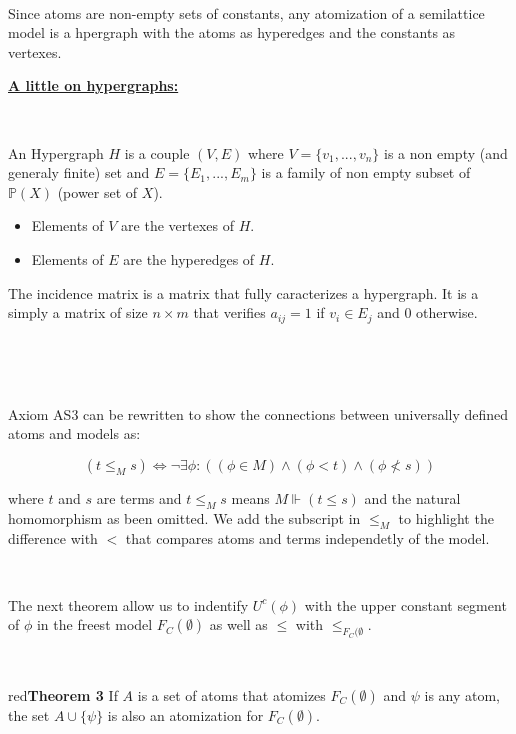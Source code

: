 \documentclass[a4paper, 11pt]{article}
\begin{document}
\

Since atoms are non-empty sets of constants, any atomization of a semilattice model is a hpergraph with the atoms as hyperedges and the constants as vertexes.

\newpage

\noindent
\underline{\textbf{A little on hypergraphs:}}

\

An Hypergraph $H$ is a couple $(V, E)$ where $V =\{v_1, ..., v_n\}$ is a non empty (and generaly finite) set and $E =\{E_1, ..., E_m\}$ is a family of non empty subset of $\mathbb{P}(X)$ (power set of $X$).
\begin{itemize} 
	\item Elements of $V$ are the vertexes of $H$.
	\item Elements of $E$ are the hyperedges of $H$.
\end{itemize}

The incidence matrix is a matrix that fully caracterizes a hypergraph. It is a simply a matrix of size $n \times m$ that verifies $a_{ij} = 1$ if $v_i \in E_j$ and 0 otherwise.

\

\

Axiom AS3 can be rewritten to show the connections between universally defined atoms and models as:

$$(t \leq_M s) \Leftrightarrow \neg \exists \phi : ((\phi \in M) \land (\phi < t) \land (\phi \not < s))$$

where $t$ and $s$ are terms and $t \leq_M s$ means $M \Vdash (t \leq s)$ and the natural homomorphism as been omitted. We add the subscript in $\leq_M$ to highlight the difference with $<$ that compares atoms and terms independetly of the model. 

\

The next theorem allow us to indentify $U^c(\phi)$ with the upper constant segment of $\phi$ in the freest model $F_C(\emptyset)$ as well as $\leq$ with $\leq_{F_C(\emptyset}$.

\

\begin{mybox}{red}{\textbf{Theorem 3}}
	If $A$ is a set of atoms that atomizes $F_C(\emptyset)$ and $\psi$ is any atom, the set $A \cup\{\psi\}$ is also an atomization for $F_C(\emptyset)$.
\end{mybox}
\end{document}
